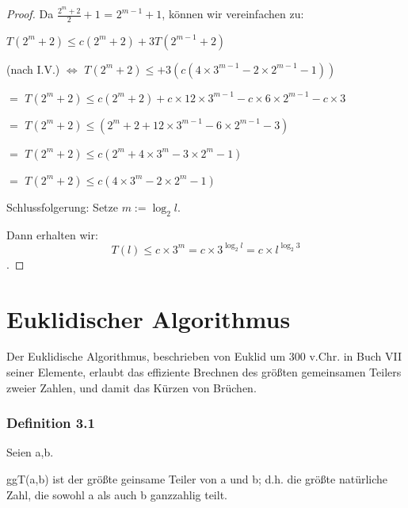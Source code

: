 \documentclass[12pt]{article}
\begin{document}
\begin{algorithm}
\begin{proof}
\vspace{0.2cm}
Da $\frac{2^m+2}{2}  +1$ = $2^{m-1}+1$, können wir vereinfachen zu: 

\vspace{0.15cm}
$T( 2^m +2) \leq c (2^m +2) +3T ( 2^{m-1} +2)$ 

\vspace{0.15cm}
(nach I.V.) $\Leftrightarrow $ $T( 2^m +2) \leq+3( c ( 4 \times 3^{m-1} -2 \times 2^{m-1} -1))$

\vspace{0.15cm}
$=$ $T(2^m +2) \leq c (2^m +2) + c \times 12 \times 3^{m-1} - c\times 6 \times 2^{m-1} - c \times 3 $

\vspace{0.15cm}
$=$  $T(2^m +2) \leq (2^m +2 +12 \times 3^{m-1} - 6 \times 2^{m-1} -3)$

\vspace{0.15cm}

$=$ $ T(2^m +2) \leq c( 2^m + 4 \times 3^m -3 \times 2^m -1)$

$= $ $T(2^m +2) \leq c (4 \times 3^m -2 \times 2^m -1) $


\vspace{0.4cm}
\noindent Schlussfolgerung: Setze $ m:= \log_2 l $.


\noindent Dann erhalten wir: $$T(l) \leq c \times 3^m = c \times 3^{\log_2 l} = c \times l^{\log_2 3} $$.

\end{proof}









\vspace{2cm}
\section{Euklidischer Algorithmus}
Der Euklidische Algorithmus, beschrieben von Euklid um 300 v.Chr. in Buch VII seiner Elemente, erlaubt das effiziente Brechnen des größten gemeinsamen Teilers zweier Zahlen, und damit das Kürzen von Brüchen.

\vspace{1cm}
\subsubsection*{Definition 3.1}
Seien a,b\in {}. 

\noindent ggT(a,b) ist der größte geinsame Teiler von a und b; d.h. die größte natürliche Zahl, die sowohl a als auch b ganzzahlig teilt. 


\end{algorithm}
\end{document}
